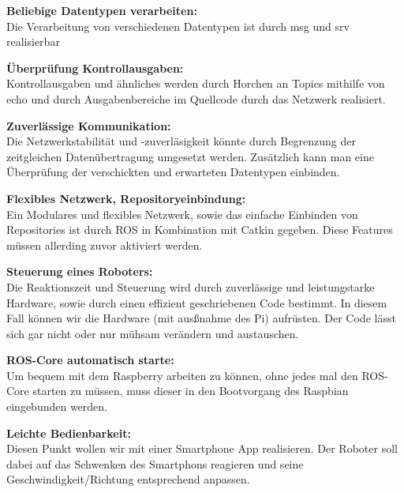 \documentclass[12pt]{article}
\begin{document}
{\bf Beliebige Datentypen verarbeiten:}\\
Die Verarbeitung von verschiedenen Datentypen ist durch msg und srv realisierbar

{\bf Überprüfung Kontrollausgaben:}\\
Kontrollausgaben und ähnliches werden durch Horchen an Topics mithilfe von echo und durch Ausgabenbereiche im Quellcode durch das Netzwerk realisiert.
 

{\bf Zuverlässige Kommunikation:}\\
Die Netzwerkstabilität und -zuverläsigkeit könnte durch Begrenzung der zeitgleichen Datenübertragung umgesetzt werden. Zusätzlich kann man eine Überprüfung der verschickten und erwarteten Datentypen einbinden.


{\bf Flexibles Netzwerk, Repositoryeinbindung:}\\
Ein Modulares und flexibles Netzwerk, sowie das einfache Einbinden von Repositories ist durch ROS in Kombination mit Catkin gegeben. Diese Features müssen allerding zuvor aktiviert werden.

\vspace {0,6cm}

{\bf Steuerung eines Roboters:}\\
Die Reaktionszeit und Steuerung wird durch zuverlässige und leistungstarke Hardware, sowie durch einen effizient geschriebenen Code bestimmt. In diesem Fall können wir die Hardware (mit ausßnahme des Pi) aufrüsten. Der Code lässt sich gar nicht oder nur mühsam verändern und austauschen.

{\bf ROS-Core automatisch starte:}\\
Um bequem mit dem Raspberry arbeiten zu können, ohne jedes mal den ROS-Core starten zu müssen, muss dieser in den Bootvorgang des Raspbian eingebunden werden.

{\bf Leichte Bedienbarkeit:}\\
Diesen Punkt wollen wir mit einer Smartphone App realisieren. Der Roboter soll dabei auf das Schwenken des Smartphons reagieren und seine Geschwindigkeit/Richtung entsprechend anpassen.
\end{document}
